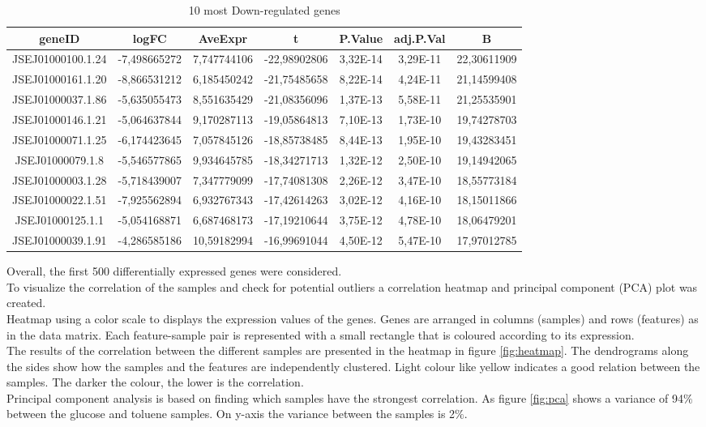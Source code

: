 \documentclass[12pt, a4paper]{report}
\begin{document}
\begin{table}[H]
	\centering
	\scriptsize
	\begin{tabular}{c|c|c|c|c|c|c}
		\textbf{geneID}& \textbf{logFC}&\textbf{AveExpr}&\textbf{t}&\textbf{P.Value}&\textbf{adj.P.Val}& \textbf{B}\\
		\hline
		JSEJ01000100.1.24&	-7,498665272&	7,747744106&	-22,98902806&	3,32E-14&	3,29E-11&	22,30611909\\
		JSEJ01000161.1.20&	-8,866531212&	6,185450242	&-21,75485658	&8,22E-14&	4,24E-11&	21,14599408\\
		JSEJ01000037.1.86&	-5,635055473&	8,551635429	&-21,08356096&	1,37E-13&	5,58E-11&	21,25535901\\
		JSEJ01000146.1.21	&-5,064637844&	9,170287113	&-19,05864813&	7,10E-13&	1,73E-10&	19,74278703\\
		JSEJ01000071.1.25	&-6,174423645&	7,057845126	&-18,85738485&	8,44E-13&	1,95E-10&	19,43283451\\
		JSEJ01000079.1.8	&-5,546577865&	9,934645785	&-18,34271713&	1,32E-12&	2,50E-10&	19,14942065\\
		JSEJ01000003.1.28&	-5,718439007&	7,347779099	&-17,74081308&	2,26E-12&	3,47E-10&	18,55773184\\
		JSEJ01000022.1.51&	-7,925562894&	6,932767343	&-17,42614263&	3,02E-12&	4,16E-10&	18,15011866\\
		JSEJ01000125.1.1&	-5,054168871&	6,687468173	&-17,19210644&	3,75E-12&	4,78E-10&	18,06479201\\
		JSEJ01000039.1.91&	-4,286585186&	10,59182994	&-16,99691044&	4,50E-12&	5,47E-10&	17,97012785\\
		\hline
	\end{tabular}
	\caption{10 most Down-regulated genes}
\end{table}

Overall, the first 500 differentially expressed genes were considered. \\
To visualize the correlation of the samples and check for potential outliers a correlation heatmap and principal component (PCA) plot was created. \\
Heatmap using a color scale to displays the expression values of the genes. Genes are arranged in columns (samples) and rows (features) as in the data matrix. Each feature-sample pair is represented with a small rectangle that is coloured according to its expression. \\
The results of the correlation between the different samples are presented in the heatmap in figure \ref{fig:heatmap}. The dendrograms along the sides show how the samples and the features are independently clustered. Light colour like yellow indicates a good relation between the samples. The darker the colour, the lower is the correlation. \\
Principal component analysis is based on finding which samples have the strongest correlation. As figure \ref{fig:pca} shows a variance of 94$\%$ between the glucose and toluene samples. On y-axis the variance between the samples is 2$\%$. 
\ \\
\end{document}
